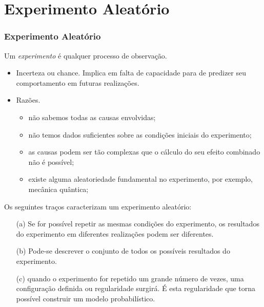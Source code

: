\section{Experimento Aleatório}
\begin{frame}
\frametitle{\textbf{Experimento Aleatório}}
\baselineskip=13pt
\begin{block}{}
	
	Um {\em experimento} é qualquer processo de observação.
	
	\begin{itemize}
		\item Incerteza ou chance. Implica em falta de capacidade para
		de predizer seu comportamento em futuras realizações.
		
		\item Razões.
		
		\begin{itemize}
			\item não sabemos todas as causas envolvidas;
			
			\item não temos dados
			suficientes sobre as condições iniciais do experimento;
			
			\item as causas
			podem ser tão complexas que o cálculo do seu efeito combinado não é
			possível;
			
			\item existe alguma aleatoriedade fundamental no
			experimento, por exemplo, mecânica quântica;
		\end{itemize}
	\end{itemize}
\end{block}

\begin{block}{}
	
	Os seguintes
	traços caracterizam um experimento aleatório:
	
	\begin{enumerate}
		\item[(a)] Se for possível repetir as mesmas condições do
		experimento, os resultados do experimento em diferentes realizações
		podem ser diferentes.
		
		\item[(b)] Pode-se descrever o conjunto de
		todos os possíveis resultados do experimento.
		
		\item[(c)] quando o experimento for repetido um grande número de
		vezes, uma configuração definida ou regularidade surgirá. É esta
		regularidade que torna possível construir um modelo probabilístico.
	\end{enumerate}
	
\end{block}
\end{frame}


